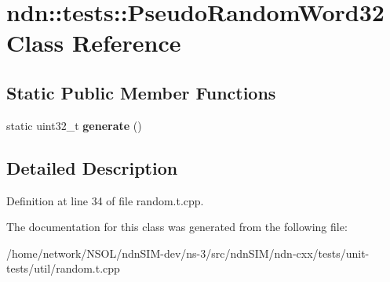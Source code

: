 \hypertarget{classndn_1_1tests_1_1PseudoRandomWord32}{}\section{ndn\+:\+:tests\+:\+:Pseudo\+Random\+Word32 Class Reference}
\label{classndn_1_1tests_1_1PseudoRandomWord32}
\subsection*{Static Public Member Functions}
\begin{DoxyCompactItemize}
\item 
static uint32\+\_\+t {\bfseries generate} ()\hypertarget{classndn_1_1tests_1_1PseudoRandomWord32_a8490d854430234050169ea28573b687a}{}\label{classndn_1_1tests_1_1PseudoRandomWord32_a8490d854430234050169ea28573b687a}

\end{DoxyCompactItemize}


\subsection{Detailed Description}


Definition at line 34 of file random.\+t.\+cpp.



The documentation for this class was generated from the following file\+:\begin{DoxyCompactItemize}
\item 
/home/network/\+N\+S\+O\+L/ndn\+S\+I\+M-\/dev/ns-\/3/src/ndn\+S\+I\+M/ndn-\/cxx/tests/unit-\/tests/util/random.\+t.\+cpp\end{DoxyCompactItemize}

